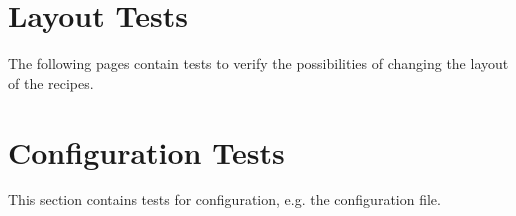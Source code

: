 \documentclass[%
a4paper,
11pt
]{article}
\begin{document}







\section{Layout Tests}
The following pages contain tests to verify the possibilities of changing the layout of the recipes.












\section{Configuration Tests}
This section contains tests for configuration, e.g. the configuration file.



%
\end{document}

